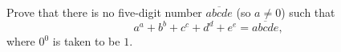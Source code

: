 Prove that there is no five-digit number $\overline{abcde}$ (so $a\ne0$) such that
\[
a^a+b^b+c^c+d^d+e^e=\overline{abcde},
\]
where $0^0$ is taken to be $1$.
